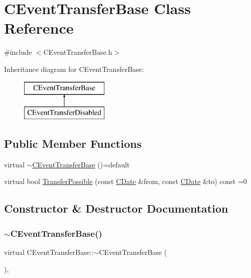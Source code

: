 \hypertarget{class_c_event_transfer_base}{}\section{C\+Event\+Transfer\+Base Class Reference}
\label{class_c_event_transfer_base}


{\ttfamily \#include $<$C\+Event\+Transfer\+Base.\+h$>$}

Inheritance diagram for C\+Event\+Transfer\+Base\+:\begin{figure}[H]
\begin{center}
\leavevmode
\includegraphics[height=2.000000cm]{class_c_event_transfer_base}
\end{center}
\end{figure}
\subsection*{Public Member Functions}
\begin{DoxyCompactItemize}
\item 
virtual \mbox{\hyperlink{class_c_event_transfer_base_a94196ebb46e7ae58fa72d83a790ebaaf}{$\sim$\+C\+Event\+Transfer\+Base}} ()=default
\item 
virtual bool \mbox{\hyperlink{class_c_event_transfer_base_aa72518d8ee05349865216c8e60459669}{Transfer\+Possible}} (const \mbox{\hyperlink{class_c_date}{C\+Date}} \&from, const \mbox{\hyperlink{class_c_date}{C\+Date}} \&to) const =0
\end{DoxyCompactItemize}


\subsection{Constructor \& Destructor Documentation}
\mbox{\label{class_c_event_transfer_base_a94196ebb46e7ae58fa72d83a790ebaaf}} 
\subsubsection{\texorpdfstring{$\sim$\+C\+Event\+Transfer\+Base()}{~CEventTransferBase()}}
{\footnotesize\ttfamily virtual C\+Event\+Transfer\+Base\+::$\sim$\+C\+Event\+Transfer\+Base (\begin{DoxyParamCaption}{ }\end{DoxyParamCaption})\hspace{0.3cm}{\ttfamily [virtual]}, {\ttfamily [default]}}



